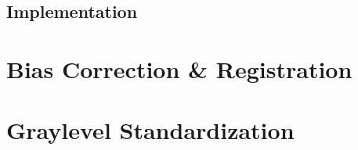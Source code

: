 \subsection{Implementation}

\section{Bias Correction \& Registration}



\section{Graylevel Standardization}

\clearpage

